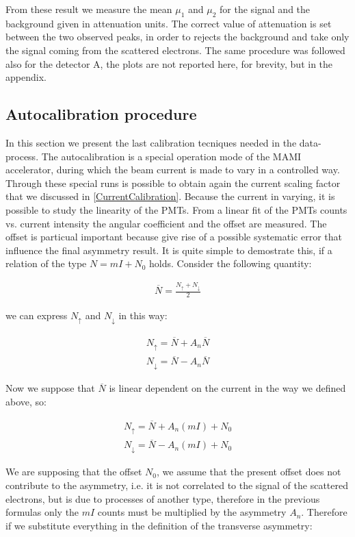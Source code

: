 From these result we measure the mean $\mu_{1}$ and $\mu_{2}$ for the signal and the background given in attenuation units. The correct value of attenuation is set between the two observed peaks, in order to rejects the background and take only the signal coming from the scattered electrons. The same procedure was followed also for the detector A, the plots are not reported here, for brevity, but in the appendix.

\subsection{Autocalibration procedure} \label{Autocalib}

In this section we present the last calibration tecniques needed in the data-process. The autocalibration is a special operation mode of the MAMI accelerator, during which the beam current is made to vary in a controlled way. Through these special runs is possible to obtain again the current scaling factor that we discussed in \ref{CurrentCalibration}. Because the current in varying, it is possible to study the linearity of the PMTs. From a linear fit of the PMTs counts vs. current intensity the angular coefficient and the offset are measured. The offset is particual important because give rise of a possible systematic error that influence the final asymmetry result. It is quite simple to demostrate this, if a relation of the type $N = mI + N_{0} $ holds. Consider the following quantity:

\begin{align*}
\overline{N} = \frac{N_{\uparrow} + N_{\downarrow}}{2}
\end{align*} 

we can express $N_{\uparrow}$ and $N_{\downarrow}$ in this way:

\begin{align*}
N_{\uparrow} = \overline{N} + A_{n}\overline{N} \\
N_{\downarrow} = \overline{N} - A_{n}\overline{N} 
\end{align*}

Now we suppose that $\overline{N}$ is linear dependent on the current in the way we defined above, so:

\begin{align*}
N_{\uparrow} = \overline{N} + A_{n}(mI) + N_{0} \\
N_{\downarrow} = \overline{N} - A_{n}(mI) + N_{0} 
\end{align*}

We are supposing that the offset $N_{0}$, we assume that the present offset does not contribute to the asymmetry, i.e. it is not correlated to the signal of the scattered electrons, but is due to processes of another type, therefore in the previous formulas only the $mI$ counts must be multiplied by the asymmetry $A_{n}$. Therefore if we substitute everything in the definition of the transverse asymmetry:

